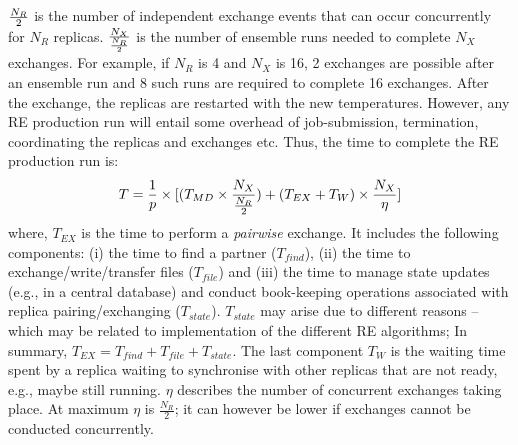 \documentclass{rspublic}
\newcommand{\alnote}[1]{ {\textcolor{blue} { ***andre: #1 }}}
\newcommand{\athotanote}[1]{ {\textcolor{green} { ***athota: #1 }}}
\newcommand{\alnote}[1]{}
\newcommand{\athotanote}[1]{}
\begin{document}
$N_R \over 2$ is the number of independent exchange events that can
occur concurrently for $N_R$ replicas. $N_X \over {N_R \over 2}$ is
the number of ensemble runs needed to complete $N_X$ exchanges.
For example, if $N_R$ is 4 and $N_X$ is 16, 2 exchanges are possible
after an ensemble run and 8 such runs are required to complete 16
exchanges.  After the exchange, the replicas are restarted with the
new temperatures.
However, any RE production run will
entail some overhead  of job-submission, termination, coordinating the replicas and exchanges
etc. Thus, the time to complete the RE production run is:
\begin{eqnarray}
  T = {1\over p} \times [(T_{MD} \times  {N_X \over {N_R \over 2} }) +
  {(T_{EX} + T_{W})} \times {N_X \over \eta}]
\label{eq:totaltime}
\end{eqnarray}
where, $T_{EX}$ is the time to perform a {\it pairwise} exchange. It
includes the following components: (i) the time to find a partner
($T_{find}$), (ii) the time to exchange/write/transfer files
($T_{file}$) and (iii) the time to manage state updates (e.g., in a
central database) and conduct book-keeping operations associated with
replica pairing/exchanging ($T_{state}$). $T_{state}$ may arise due to
different reasons -- which may be related to
implementation %
of the different RE algorithms; In summary, $T_{EX} = T_{find} +
T_{file}+T_{state}$.  The last component $T_W$ is the waiting time
spent by a replica waiting to synchronise with other replicas that are
not ready, e.g., maybe still running. $\eta$ describes the number of 
concurrent exchanges taking place. At maximum $\eta$ is $\frac{N_R}{2}$; it can however
be lower if exchanges cannot be conducted concurrently.
\end{document}
